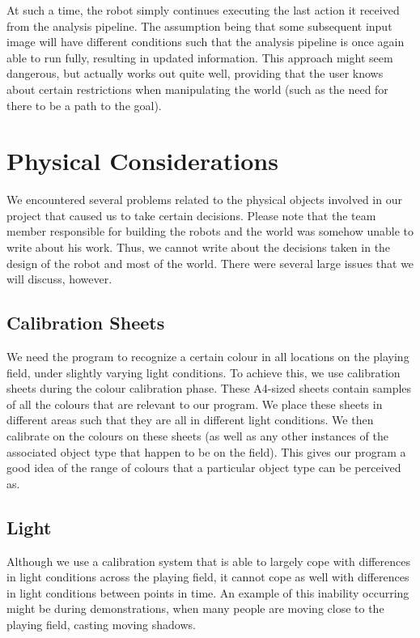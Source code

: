 \documentclass[10pt, abstracton, twocolumn]{scrartcl}
\begin{document}
At such a time, the robot simply continues executing the last action it received from the analysis pipeline. The assumption being that some subsequent input image will have different conditions such that the analysis pipeline is once again able to run fully, resulting in updated information. This approach might seem dangerous, but actually works out quite well, providing that the user knows about certain restrictions when manipulating the world (such as the need for there to be a path to the goal).

\section{Physical Considerations}
We encountered several problems related to the physical objects involved in our project that caused us to take certain decisions. Please note that the team member responsible for building the robots and the world was somehow unable to write about his work. Thus, we cannot write about the decisions taken in the design of the robot and most of the world. There were several large issues that we will discuss, however.

\subsection{Calibration Sheets}
We need the program to recognize a certain colour in all locations on the playing field, under slightly varying light conditions. To achieve this, we use calibration sheets during the colour calibration phase. These A4-sized sheets contain samples of all the colours that are relevant to our program. We place these sheets in different areas such that they are all in different light conditions. We then calibrate on the colours on these sheets (as well as any other instances of the associated object type that happen to be on the field). This gives our program a good idea of the range of colours that a particular object type can be perceived as.

\subsection{Light}
Although we use a calibration system that is able to largely cope with differences in light conditions across the playing field, it cannot cope as well with differences in light conditions between points in time. An example of this inability occurring might be during demonstrations, when many people are moving close to the playing field, casting moving shadows.
\end{document}

